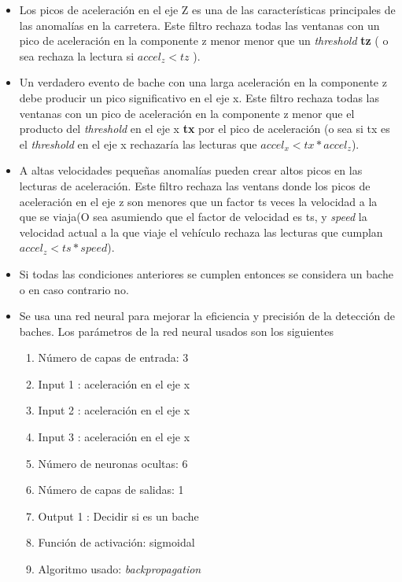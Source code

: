 \begin{itemize}
	\item Los picos de aceleración en el eje Z es una de las características principales de las anomalías en la carretera. Este filtro rechaza todas
	      las ventanas con un pico de aceleración en la componente z menor menor que un \emph{threshold} \textbf{tz} ( o sea rechaza la lectura si $accel_z < tz$ ).
	\item Un verdadero evento de bache con una larga aceleración en la componente z debe producir un pico significativo en el eje x. Este filtro rechaza
	      todas las ventanas con un pico de aceleración en la componente z menor que  el producto del \emph{threshold} en el eje x \textbf{tx} por  el pico de
	      aceleración (o sea si tx es el \emph{threshold} en el eje x rechazaría las lecturas que $accel_x < tx * accel_z$).
	\item A altas velocidades pequeñas anomalías pueden crear altos picos en las lecturas de aceleración. Este filtro rechaza las ventans donde los picos de
	      aceleración en el eje z son menores que un factor ts veces la velocidad a la que se viaja(O sea asumiendo que el factor de velocidad es ts, y \emph{speed} la velocidad actual
	      a la que viaje el vehículo rechaza las lecturas que cumplan $accel_z < ts * speed$).
	\item  Si todas las condiciones anteriores se cumplen entonces se considera un bache o en caso contrario no.
	\item  Se usa una red neural para mejorar la eficiencia y precisión de la detección de baches. Los parámetros de la red neural usados son los siguientes
	      \begin{enumerate}
		      \item Número de capas de entrada: 3
		      \item Input 1 : aceleración en el eje x
		      \item Input 2 : aceleración en el eje x
		      \item Input 3 : aceleración en el eje x
		      \item Número de neuronas ocultas: 6
		      \item Número de capas de salidas: 1
		      \item Output 1 : Decidir si es un bache
		      \item Función de activación: sigmoidal
		      \item Algoritmo usado: \emph{backpropagation}
	      \end{enumerate}

\end{itemize}

